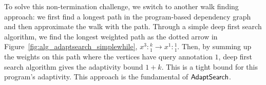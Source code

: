  To solve this non-termination challenge, we switch to another walk finding approach: we first find a longest path in the program-based dependency graph and then approximate the walk with the path.
 Through a simple deep first search algorithm, we find the longest weighted path as the dotted arrow in Figure~\ref{fig:alg_adaptsearch_simplewhile},
 $x^3: {}^k_1 \to x^1: {}^1_1 $.
 Then, by summing up the weights on this path where the vertices have query annotation $1$, deep first search algorithm gives the adaptivity bound $1 + k$.
 This is a tight bound for this program's adaptivity. This approach is the fundamental of $\mathsf{AdaptSearch}$.
 

